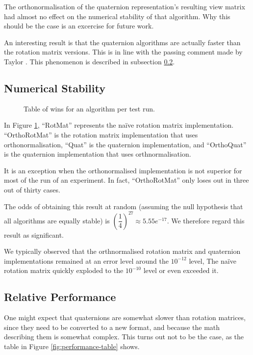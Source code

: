 \documentclass{acm_proc_article-sp}
\begin{document}
The orthonormalisation of the quaternion representation's resulting view matrix had almost no effect on the numerical stability of that algorithm.
Why this should be the case is an excercise for future work.

An interesting result is that the quaternion algorithms are actually faster than the rotation matrix versions.
This is in line with the passing comment made by Taylor \cite{taylor79}.
This phenomenon is described in subsection \ref{sec:performance}.

\subsection{Numerical Stability}
\label{sec:stability}

\begin{figure}
\caption{Table of wins for an algorithm per test run.}
\label{fig:wins}
\end{figure}

In Figure \ref{fig:wins}, ``RotMat'' represents the na\"{i}ve rotation matrix implementation. ``OrthoRotMat'' is the rotation matrix implementation that uses orthonormalisation, ``Quat'' is the quaternion implementation, and ``OrthoQuat'' is the quaternion implementation that uses orthnormalisation.

It is an exception when the orthonormalised implementation is not superior for most of the run of an experiment.
In fact, ``OrthoRotMat'' only loses out in three out of thirty cases.

The odds of obtaining this result at random (assuming the null hypothesis that all algorithms are equally stable) is $\left(\dfrac{1}{4}\right)^{27} \approx 5.55e^{-17}$.
We therefore regard this result as significant.

We typically observed that the orthnormalised rotation matrix and quaternion implementations remained at an error level around the $10^{-12}$ level,
The na\"{i}ve rotation matrix quickly exploded to the $10^{-10}$ level or even exceeded it.

\subsection{Relative Performance}
\label{sec:performance}

One might expect that quaternions are somewhat slower than rotation matrices, since they need to be converted to a new format, and because the math describing them is somewhat complex.
This turns out not to be the case, as the table in Figure \ref{fig:performance-table} shows.
\end{document}
